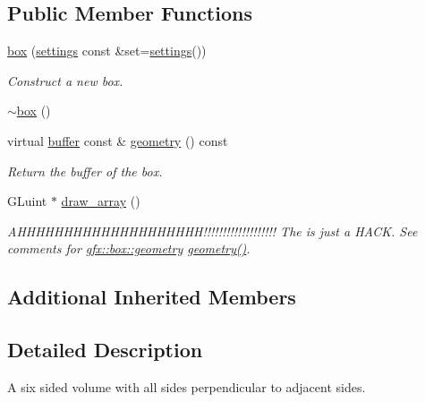 \subsection*{Public Member Functions}
\begin{DoxyCompactItemize}
\item 
\hyperlink{classgfx_1_1box_a29298bf9e3c0c7b69ab214a54cc753e3}{box} (\hyperlink{classgfx_1_1box_1_1settings}{settings} const \&set=\hyperlink{classgfx_1_1box_1_1settings}{settings}())
\begin{DoxyCompactList}\small\item\em Construct a new box. \end{DoxyCompactList}\item 
\hyperlink{classgfx_1_1box_a4b955c9dc2402f6d4bb9e59cf34acac4}{$\sim$box} ()
\item 
virtual \hyperlink{classgfx_1_1buffer}{buffer} const \& \hyperlink{classgfx_1_1box_a76d6f6bb065c811cba58d360de6db476}{geometry} () const 
\begin{DoxyCompactList}\small\item\em Return the buffer of the box. \end{DoxyCompactList}\item 
\hypertarget{classgfx_1_1box_ac9d152c560bc2474259266579f251f2e}{G\-Luint $\ast$ \hyperlink{classgfx_1_1box_ac9d152c560bc2474259266579f251f2e}{draw\-\_\-array} ()}\label{classgfx_1_1box_ac9d152c560bc2474259266579f251f2e}

\begin{DoxyCompactList}\small\item\em A\-H\-H\-H\-H\-H\-H\-H\-H\-H\-H\-H\-H\-H\-H\-H\-H\-H\-H\-H\-H!!!!!!!!!!!!!!!!!!! The is just a H\-A\-C\-K. See comments for \hyperlink{classgfx_1_1box_a76d6f6bb065c811cba58d360de6db476}{gfx\-::box\-::geometry} \hyperlink{classgfx_1_1box_a76d6f6bb065c811cba58d360de6db476}{geometry()}. \end{DoxyCompactList}\end{DoxyCompactItemize}
\subsection*{Additional Inherited Members}


\subsection{Detailed Description}
A six sided volume with all sides perpendicular to adjacent sides. 

